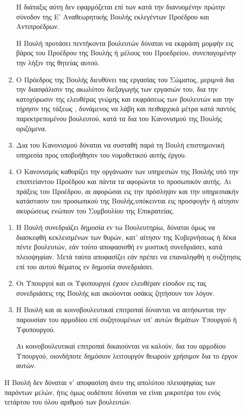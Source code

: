 \documentclass[twoside, a4paper, 10pt]{article}
\begin{document}
\begin{multicols}{2}
\begin{enumerate}
\begin{BigQuote}
\begin{enumerate}
	Η διάταξις αύτη δεν εφαρμόζεται επί των κατά την διανυομένην πρώτην σύνοδον της Ε' Αναθεωρητικής Βουλής εκλεγέντων Προέδρου και Αντιπροέδρων.

	Η Βουλή προτάσει πεντήκοντα βουλευτών δύναται να εκφράση μομφήν εις βάρος του Προέδρου της Βουλής ή μέλους του Προεδρείου, συνεπαγομένην την λήξιν της θητείας αυτού.
  \item[4.] Ο Πρόεδρος της Βουλής διευθύνει τας εργασίας του Σώματος, μεριμνά δια την διασφάλισιν της ακωλύτου διεξαγωγής των εργασιών του, δια την κατοχύρωσιν της ελευθέρας γνώμης και εκφράσεως των βουλευτών και την τήρησιν της τάξεως , δυνάμενος να λάβη και πειθαρχικά μέτρα κατά παντός παρεκτρεπομένου βουλευτού, κατά τα δια του Κανονισμού της Βουλής οριζόμενα.
  \item[5.] Δια του Κανονισμού δύναται να συσταθή παρά τη Βουλή επιστημονική υπηρεσία προς υποβοήθησιν του νομοθετικού αυτής έργου.
  \item[6.] Ο Κανονισμός καθορίζει την οργάνωσιν των υπηρεσιών της Βουλής υπό την εποπτείαντου Προέδρου και πάντα τα αφορώντα το προσωπικόν αυτής. Αι πράξεις του Προέδρου, αι αφορώσαι εις την πρόσληψιν και την υπηρεσιακήν κατάστασιν του προσωπικού της Βουλής,υπόκεινται εις προσφυγήν ή αίτησιν ακυρώσεως ενώπιον του Συμβουλίου της Επικρατείας.
\end{enumerate}

\begin{enumerate}
  \item[1.] Η Βουλή συνεδριάζει δημοσία εν τω Βουλευτηρίω, δύναται όμως να διασκεφθή κεκλεισμένων των θυρών, κατ' αίτησιν της Κυβερνήσεως ή δέκα πέντε βουλευτών, εάν τούτο αποφασισθή  εν μυστική συνεδριάσει, κατά πλειοψηφίαν. Μετά ταύτα αποφασίζει εάν πρέπει να επαναληφθή η συζήτησις επί του αυτού θέματος εν δημοσία συνεδριάσει.
  \item[2.] Οι Υπουργοί και οι Υφυπουργοί έχουν ελευθέραν είσοδον εις τας συνεδριάσεις της Βουλής και ακούονται οσάκις ζητήσουν τον λόγον.
  \item[3.] Η Βουλή και αι κοινοβουλευτικαί επιτροπαί δύνανται να αιτήσωνται την παρουσίαν του αρμοδίου επί συζητουμένων υπ' αυτών θεμάτων Υπουργού ή Υφυπουργού.

	Αι κοινοβουλευτικαί επιτροπαί δικαιούνται να καλούν, δια του αρμοδίου Υπουργού, οιονδήποτε δημόσιον λειτουργόν θεωρούν χρήσιμον δια το έργον αυτών.
\end{enumerate}

Η Βουλή δεν δύναται ν' αποφασίση άνευ της απολύτου πλειοψηφίας των παρόντων μελών, ήτις όμως ουδέποτε δύναται να είναι μικροτέρα του ενός τετάρτου του όλου αριθμού των βουλευτών.


\end{BigQuote}
\end{enumerate}
\end{multicols}
\end{document}
